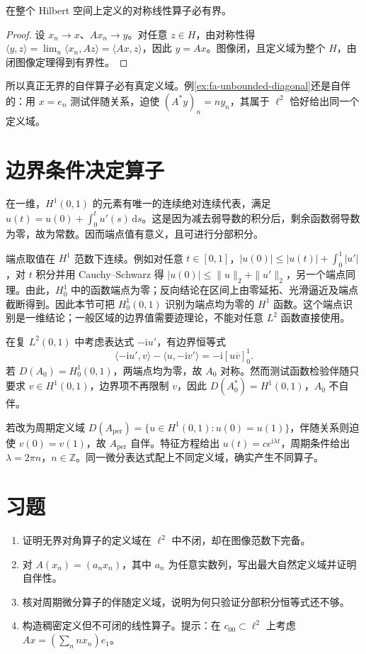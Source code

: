 \documentclass[UTF8,12pt,a4paper,fontset=fandol]{ctexbook}
\begin{document}
\begin{theorem}
在整个 Hilbert 空间上定义的对称线性算子必有界。
\end{theorem}
\begin{proof}
设 $x_n\to x$、$Ax_n\to y$。对任意 $z\in H$，由对称性得 $\langle y,z\rangle=\lim_n\langle x_n,Az\rangle=\langle Ax,z\rangle$，因此 $y=Ax$。图像闭，且定义域为整个 $H$，由闭图像定理得到有界性。
\end{proof}
所以真正无界的自伴算子必有真定义域。例\ref{ex:fa-unbounded-diagonal}还是自伴的：用 $x=e_n$ 测试伴随关系，迫使 $(A^*y)_n=ny_n$，其属于 $\ell^2$ 恰好给出同一个定义域。

\section{边界条件决定算子}
在一维，$H^1(0,1)$ 的元素有唯一的连续绝对连续代表，满足 $u(t)=u(0)+\int_0^tu'(s)\,\mathrm ds$。这是因为减去弱导数的积分后，剩余函数弱导数为零，故为常数。因而端点值有意义，且可进行分部积分。

端点取值在 $H^1$ 范数下连续。例如对任意 $t\in[0,1]$，$|u(0)|\leq|u(t)|+\int_0^1|u'|$，对 $t$ 积分并用 Cauchy--Schwarz 得 $|u(0)|\leq\|u\|_2+\|u'\|_2$，另一个端点同理。由此，$H_0^1$ 中的函数端点为零；反向结论在区间上由零延拓、光滑逼近及端点截断得到。因此本节可把 $H_0^1(0,1)$ 识别为端点均为零的 $H^1$ 函数。这个端点识别是一维结论；一般区域的边界值需要迹理论，不能对任意 $L^2$ 函数直接使用。

在复 $L^2(0,1)$ 中考虑表达式 $-\mathrm i u'$，有边界恒等式
\[
 \langle-\mathrm iu',v\rangle-\langle u,-\mathrm iv'\rangle
 =-\mathrm i[u\overline v]_0^1.
\]
若 $D(A_0)=H_0^1(0,1)$，两端点均为零，故 $A_0$ 对称。然而测试函数检验伴随只要求 $v\in H^1(0,1)$，边界项不再限制 $v$，因此 $D(A_0^*)=H^1(0,1)$，$A_0$ 不自伴。

若改为周期定义域 $D(A_{\mathrm{per}})=\{u\in H^1(0,1):u(0)=u(1)\}$，伴随关系则迫使 $v(0)=v(1)$，故 $A_{\mathrm{per}}$ 自伴。特征方程给出 $u(t)=ce^{\mathrm i\lambda t}$，周期条件给出 $\lambda=2\pi n$，$n\in\mathbb Z$。同一微分表达式配上不同定义域，确实产生不同算子。

\section{习题}
\begin{enumerate}
 \item 证明无界对角算子的定义域在 $\ell^2$ 中不闭，却在图像范数下完备。
 \item 对 $A(x_n)=(a_nx_n)$，其中 $a_n$ 为任意实数列，写出最大自然定义域并证明自伴性。
 \item 核对周期微分算子的伴随定义域，说明为何只验证分部积分恒等式还不够。
 \item 构造稠密定义但不可闭的线性算子。提示：在 $c_{00}\subset\ell^2$ 上考虑 $Ax=(\sum_nnx_n)e_1$。
\end{enumerate}
\end{document}
